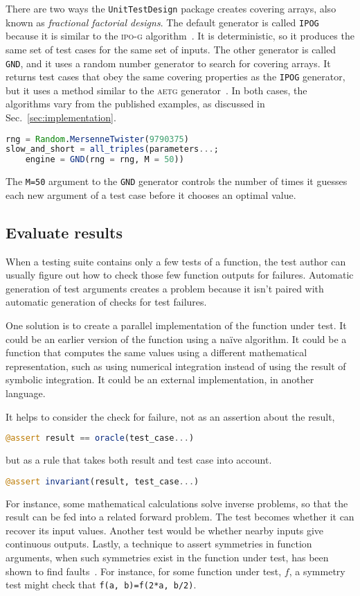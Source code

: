 \documentclass{juliacon}
\newcommand{\utd}{\texttt{UnitTestDesign}\xspace}
\begin{document}
\vskip 6pt
There are two ways the \utd package creates covering arrays, also known as \emph{fractional factorial designs}. The default generator is called \verb|IPOG| because it is similar to the \textsc{ipo-g} algorithm~\cite{Lei2008-xt}. It is deterministic, so it produces the same set of test cases for the same set of inputs. The other generator is called \verb|GND|, and it uses a random number generator to search for covering arrays. It returns test cases that obey the same covering properties as the \verb|IPOG| generator, but it uses a method similar to the \textsc{aetg} generator~\cite{Cohen1997-lb}. In both cases, the algorithms vary from the published examples, as discussed in Sec.~\ref{sec:implementation}.
\begin{lstlisting}[language=Julia]
rng = Random.MersenneTwister(9790375)
slow_and_short = all_triples(parameters...;
    engine = GND(rng = rng, M = 50))
\end{lstlisting}
The \verb|M=50| argument to the \verb|GND| generator controls the number of times it guesses each new argument of a test case before it chooses an optimal value.

\subsection{Evaluate results}\label{sec:results}

When a testing suite contains only a few tests of a function, the test author can usually figure out how to check those few function outputs for failures. Automatic generation of test arguments creates a problem because it isn't paired with automatic generation of checks for test failures.

\vskip 6pt
One solution is to create a parallel implementation of the function under test. It could be an earlier version of the function using a na{\"i}ve algorithm. It could be a function that computes the same values using a different mathematical representation, such as using numerical integration instead of using the result of symbolic integration. It could be an external implementation, in another language.

\vskip 6pt
It helps to consider the check for failure, not as an assertion about the result,
\begin{lstlisting}[language=Julia]
@assert result == oracle(test_case...)
\end{lstlisting}
but as a rule that takes both result and test case into account.
\begin{lstlisting}[language=Julia]
@assert invariant(result, test_case...)
\end{lstlisting}
For instance, some mathematical calculations solve inverse problems, so that the result can be fed into a related forward problem. The test becomes whether it can recover its input values. Another test would be whether nearby inputs give continuous outputs. Lastly, a technique to assert symmetries in function arguments, when such symmetries exist in the function under test, has been shown to find faults~\cite{Segura2016-qh}. For instance, for some function under test, $f$, a symmetry test might check that \verb|f(a, b)=f(2*a, b/2)|.
\end{document}
